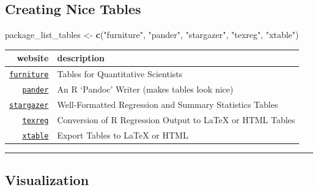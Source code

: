 \documentclass[]{book}
\newenvironment{Shaded}{\begin{snugshade}}{\end{snugshade}}
\newcommand{\KeywordTok}[1]{\textcolor[rgb]{0.13,0.29,0.53}{\textbf{#1}}}
\newcommand{\StringTok}[1]{\textcolor[rgb]{0.31,0.60,0.02}{#1}}
\newcommand{\NormalTok}[1]{#1}
\theoremstyle{definition}
\theoremstyle{definition}
\theoremstyle{definition}
\theoremstyle{remark}
\begin{document}
\subsection{Creating Nice Tables}\label{creating-nice-tables}

\begin{Shaded}
\begin{Highlighting}[]
\NormalTok{package_list_tables <-}\StringTok{  }\KeywordTok{c}\NormalTok{(}\StringTok{"furniture"}\NormalTok{, }
                          \StringTok{"pander"}\NormalTok{, }
                          \StringTok{"stargazer"}\NormalTok{, }
                          \StringTok{"texreg"}\NormalTok{,}
                          \StringTok{"xtable"}\NormalTok{)}
\end{Highlighting}
\end{Shaded}

\begin{longtable}[]{@{}rl@{}}
\toprule
website & description\tabularnewline
\midrule
\endhead
\href{http://tysonbarrett.com/furniture/}{\texttt{furniture}} & Tables
for Quantitative Scientists\tabularnewline
\href{https://rapporter.github.io/pander/}{\texttt{pander}} & An R
`Pandoc' Writer (makes tables look nice)\tabularnewline
\href{https://www.jakeruss.com/cheatsheets/stargazer/}{\texttt{stargazer}}
& Well-Formatted Regression and Summary Statistics Tables\tabularnewline
\href{https://diffuseprior.wordpress.com/2013/01/20/texreg-a-package-for-beautiful-and-easily-customizable-latex-regression-tables-from-r/}{\texttt{texreg}}
& Conversion of R Regression Output to LaTeX or HTML
Tables\tabularnewline
\href{https://cran.r-project.org/web/packages/xtable/vignettes/xtableGallery.pdf}{\texttt{xtable}}
& Export Tables to LaTeX or HTML\tabularnewline
\bottomrule
\end{longtable}

\begin{center}\rule{0.5\linewidth}{\linethickness}\end{center}

\subsection{Visualization}\label{visualization}
\end{document}
